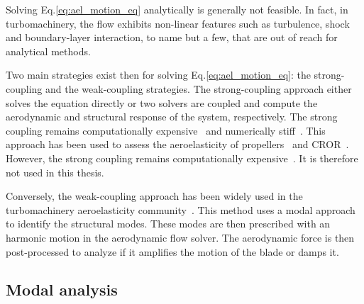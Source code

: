 
Solving Eq.\ref{eq:ael_motion_eq} analytically is generally 
not feasible. In fact, in turbomachinery, 
the flow exhibits non-linear features such as turbulence, shock and
boundary-layer interaction, to name but a few, that are out of reach for
analytical methods.

Two main strategies exist then for solving Eq.\ref{eq:ael_motion_eq}:
the strong-coupling and the weak-coupling strategies. The strong-coupling 
approach either solves the equation directly or two solvers are coupled and 
compute the aerodynamic and structural response of the system, respectively.
The strong coupling remains computationally expensive~\cite{Bartels2007}
and numerically stiff~\cite{Datta2008}. This approach
has been used to assess the
aeroelasticity of propellers~\cite{Ruiz-Calavera2012} and
CROR~\cite{Laban2010}. However, 
the strong coupling remains 
computationally expensive~\cite{Bartels2007}.
It is therefore not used in this thesis.

Conversely, the weak-coupling approach has been widely used
in the turbomachinery aeroelasticity community~\cite{Marshall1996}.
This method uses a modal approach to identify the structural modes.
These modes are then prescribed with an harmonic motion in the aerodynamic
flow solver. The aerodynamic force is then post-processed to 
analyze if it amplifies the motion of the blade or damps it.

\subsection{Modal analysis}
\label{sub:modal_analysis}

